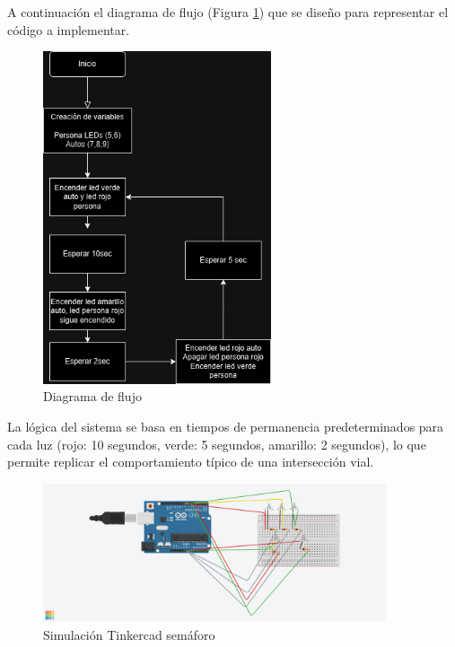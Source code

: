 \documentclass{article}
\begin{document}
A continuación el diagrama de flujo (Figura \ref{fig:flujo_semaforo}) que se diseño para representar el código a implementar.

\begin{figure}[H]
    \centering
    \includegraphics[width=0.6\textwidth]{./img/flujo_semaforo.png}
    \caption{Diagrama de flujo}
    \label{fig:flujo_semaforo}
\end{figure}

La lógica del sistema se basa en tiempos de permanencia predeterminados para cada luz (rojo: 10 segundos, verde: 5 segundos, amarillo: 2 segundos), lo que permite replicar el comportamiento típico de una intersección vial.

\begin{figure}[H]
    \centering
    \includegraphics[width=0.9\textwidth]{./img/simulacion_semaforo.png}
    \caption{Simulación Tinkercad semáforo}
    \label{fig:simulacion_semaforo}
\end{figure}
\end{document}
